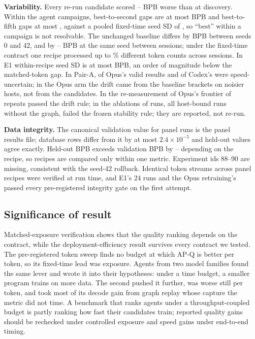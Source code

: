 \documentclass{article}
\newif\ifshowhumanmarkers \showhumanmarkersfalse
\newcommand{\humantag}[1]{{\color{humanframe}\sffamily\scriptsize\bfseries HUMAN AUTHOR MUST REWRITE/VERIFY [#1]}\ }
\newcommand{\humanauthor}[2][]{\ifshowhumanmarkers\begin{humanbox}\humantag{#1}#2\end{humanbox}\else #2\par\fi}
\begin{document}
\humanauthor[P2-10]{\textbf{Variability.} Every re-run candidate scored \CROptMin--\CROptMax{} BPB worse than at discovery. Within the agent campaigns, best-to-second gaps are at most \CRGapTwoMax{} BPB and best-to-fifth gaps at most \CRGapFiveMax, against a pooled fixed-time seed SD of \CRPooledSD, so ``best'' within a campaign is not resolvable. The unchanged baseline differs by \CRBaseSeedEffect{} BPB between seeds 0 and 42, and by \CRSessionLo--\CRSessionHi{} BPB at the same seed between sessions; under the fixed-time contract one recipe processed up to \CRTokenSpreadMax\% different token counts across sessions. In E1 within-recipe seed SD is at most \CREOneMaxSD{} BPB, an order of magnitude below the matched-token gap. In Pair-A, \CROpUncertain{} of Opus's \CROpValid{} valid results and \CRCxUncertain{} of Codex's \CRCxValid{} were speed-uncertain; in the Opus arm the drift came from the baseline brackets on noisier hosts, not from the candidates. In the re-measurement of Opus's frontier \CROpStableRepeats{} of \CROpRepeats{} repeats passed the drift rule; in the ablations \CRIAUnstable{} of \CRIARuns{} runs, all host-bound runs without the graph, failed the frozen stability rule; they are reported, not re-run.}

\humanauthor[P2-11]{\textbf{Data integrity.} The canonical validation value for panel runs is the panel results file; database rows differ from it by at most $2.4\times10^{-5}$ and held-out values agree exactly. Held-out BPB exceeds validation BPB by \CRHeldValOffLo--\CRHeldValOffHi{} depending on the recipe, so recipes are compared only within one metric. Experiment ids 88--90 are missing, consistent with the seed-42 rollback. Identical token streams across panel recipes were verified at run time, and E1's 24 runs and the Opus retraining's \CRMTRuns{} passed every pre-registered integrity gate on the first attempt.}

\subsection{Significance of result}
\humanauthor[P2-12]{Matched-exposure verification shows that the quality ranking depends on the contract, while the deployment-efficiency result survives every contract we tested. The pre-registered token sweep finds no budget at which AP-Q is better per token, so its fixed-time lead was exposure. Agents from two model families found the same lever and wrote it into their hypotheses: under a time budget, a smaller program trains on more data. The second pushed it further, was worse still per token, and took most of its decode gain from graph replay whose capture the metric did not time. A benchmark that ranks agents under a throughput-coupled budget is partly ranking how fast their candidates train; reported quality gains should be rechecked under controlled exposure and speed gains under end-to-end timing.}
\end{document}
